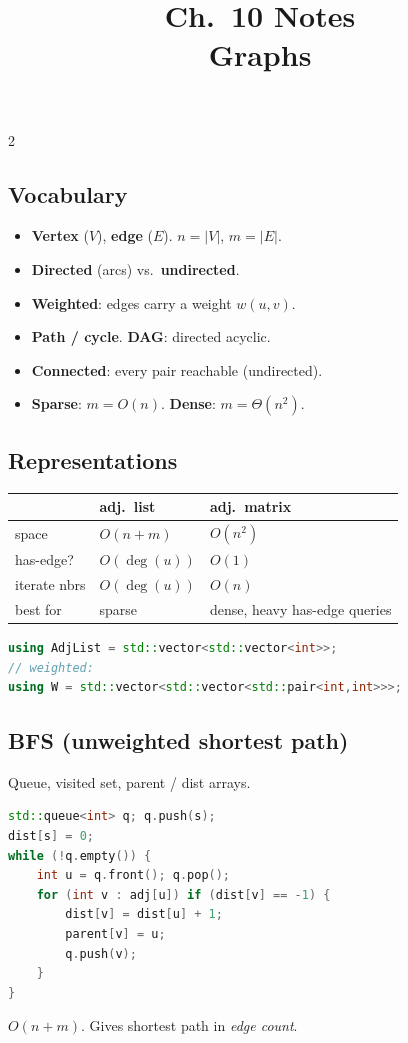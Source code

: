 \documentclass[10pt]{article}
\title{Ch.~10 Notes\\\large Graphs}
\author{}
\date{}
\begin{document}
\maketitle
\vspace{-2em}

\begin{multicols}{2}

\subsection*{Vocabulary}
\begin{itemize}
    \item \textbf{Vertex} ($V$), \textbf{edge} ($E$). $n = |V|$, $m = |E|$.
    \item \textbf{Directed} (arcs) vs.\ \textbf{undirected}.
    \item \textbf{Weighted}: edges carry a weight $w(u,v)$.
    \item \textbf{Path / cycle}. \textbf{DAG}: directed acyclic.
    \item \textbf{Connected}: every pair reachable (undirected).
    \item \textbf{Sparse}: $m = O(n)$. \textbf{Dense}: $m = \Theta(n^2)$.
\end{itemize}

\subsection*{Representations}
\begin{tabular}{@{}l|l|l@{}}
             & \textbf{adj.\ list}    & \textbf{adj.\ matrix}\\
\hline
space        & $O(n+m)$               & $O(n^2)$\\
has-edge?    & $O(\deg(u))$           & $O(1)$\\
iterate nbrs & $O(\deg(u))$           & $O(n)$\\
best for     & sparse                 & dense, heavy has-edge queries
\end{tabular}

\begin{lstlisting}[language=C++]
using AdjList = std::vector<std::vector<int>>;
// weighted:
using W = std::vector<std::vector<std::pair<int,int>>>;
\end{lstlisting}

\subsection*{BFS (unweighted shortest path)}
Queue, visited set, parent / dist arrays.
\begin{lstlisting}[language=C++]
std::queue<int> q; q.push(s);
dist[s] = 0;
while (!q.empty()) {
    int u = q.front(); q.pop();
    for (int v : adj[u]) if (dist[v] == -1) {
        dist[v] = dist[u] + 1;
        parent[v] = u;
        q.push(v);
    }
}
\end{lstlisting}
$O(n+m)$. Gives shortest path in \emph{edge count}.


\end{multicols}
\end{document}
